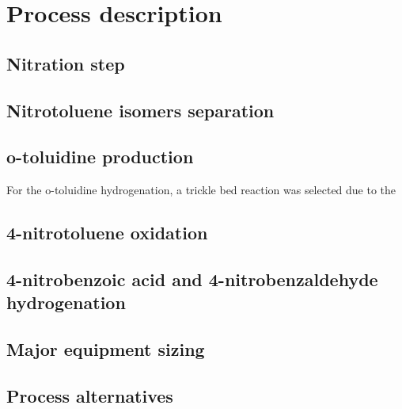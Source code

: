\section{Process description}
\label{sec:process}
\subsection{Nitration step}

\subsection{Nitrotoluene isomers separation}



\subsection{o-toluidine production}
For the o-toluidine hydrogenation, a trickle bed reaction was selected due to the
\subsection{4-nitrotoluene oxidation}

\subsection{4-nitrobenzoic acid and 4-nitrobenzaldehyde hydrogenation}


\subsection{Major equipment sizing}


\subsection{Process alternatives}



